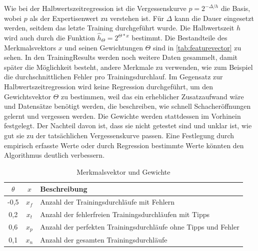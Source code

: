 
Wie bei der Halbwertszeitregression ist die Vergessenskurve $p = 2^{-\Delta/h}$ die Basis, wobei $p$ als der Expertisenwert zu verstehen ist. Für $\Delta$ kann die Dauer eingesetzt werden, seitdem das letzte Training durchgeführt wurde.
Die Halbwertszeit $h$ wird auch durch die Funktion $\hat{h}_\Theta = 2^{\Theta*x}$ bestimmt.
Die Bestandteile des Merkmalsvektors $x$ und seinen Gewichtungen $\Theta$ sind in \autoref{tab:featurevector} zu sehen.
In den TrainingResults werden noch weitere Daten gesammelt, damit später die Möglichkeit besteht, andere Merkmale zu verwenden, wie zum Beispiel die durchschnittlichen Fehler pro Trainingsdurchlauf.
Im Gegensatz zur Halbwertszeitregression wird keine Regression durchgeführt, um den Gewichtsvektor $\Theta$ zu bestimmen, weil das ein erheblicher Zusatzaufwand wäre und Datensätze benötigt werden, die beschreiben, wie schnell Schacheröffnungen gelernt und vergessen werden. Die Gewichte werden stattdessen im Vorhinein festgelegt. Der Nachteil davon ist, dass sie nicht getestet sind und unklar ist, wie gut sie zu der tatsächlichen Vergessenskurve passen. Eine Festlegung durch empirisch erfasste Werte oder durch Regression bestimmte Werte könnten den Algorithmus deutlich verbessern.

\begin{table}[htb]
    \centering
    \begin{tabular}{|c|c|l|}
        \hline
        $\theta$ & $x$ & Beschreibung \\
        \hline
        -0,5 & $x_f$ & Anzahl der Trainingsdurchläufe mit Fehlern \\
        \hline
        0,2 & $x_t$ & Anzahl der fehlerfreien Trainingsdurchläufen mit Tipps \\
        \hline
        0,6 & $x_p$ & Anzahl der perfekten Trainingsdurchläufe ohne Tipps und Fehler \\
        \hline
        0,1 & $x_n$ & Anzahl der gesamten Trainingsdurchläufe \\
        \hline
    \end{tabular}
    \caption{Merkmalsvektor und Gewichte}
    \label{tab:featurevector}
\end{table}

